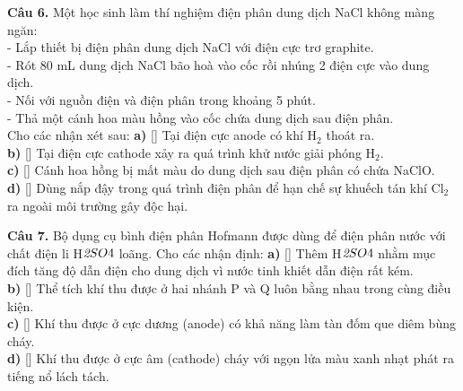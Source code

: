\documentclass{article}
\begin{document}
\fontsize{22}{29}\selectfont
\textbf{Câu 6.} Một học sinh làm thí nghiệm điện phân dung dịch NaCl không màng ngăn:\\ 
- Lắp thiết bị điện phân dung dịch NaCl với điện cực trơ graphite.\\ 
- Rót 80 mL dung dịch NaCl bão hoà vào cốc rồi nhúng 2 điện cực vào dung dịch.\\ 
- Nối với nguồn điện và điện phân trong khoảng 5 phút.\\ 
- Thả một cánh hoa màu hồng vào cốc chứa dung dịch sau điện phân.\\ 
Cho các nhận xét sau:
\vspace{6pt}
\textbf{a)} [\quad] Tại điện cực anode có khí H$_{\text{2}}$ thoát ra.\\[4pt]
\textbf{b)} [\quad] Tại điện cực cathode xảy ra quá trình khử nước giải phóng H$_{\text{2}}$.\\[4pt]
\textbf{c)} [\quad] Cánh hoa hồng bị mất màu do dung dịch sau điện phân có chứa NaClO.\\[4pt]
\textbf{d)} [\quad] Dùng nắp đậy trong quá trình điện phân để hạn chế sự khuếch tán khí Cl$_{\text{2}}$ ra ngoài môi trường gây độc hại.\\[4pt]
\vspace*{\fill}
\newpage

\fontsize{22}{29}\selectfont
\textbf{Câu 7.} Bộ dụng cụ bình điện phân Hofmann được dùng để điện phân nước với chất điện li H$\textit{{\text{2}}$SO$}{\text{4}}$ loãng. Cho các nhận định:
\vspace{6pt}
\textbf{a)} [\quad] Thêm H$\textit{{\text{2}}$SO$}{\text{4}}$ nhằm mục đích tăng độ dẫn điện cho dung dịch vì nước tinh khiết dẫn điện rất kém.\\[4pt]
\textbf{b)} [\quad] Thể tích khí thu được ở hai nhánh P và Q luôn bằng nhau trong cùng điều kiện.\\[4pt]
\textbf{c)} [\quad] Khí thu được ở cực dương (anode) có khả năng làm tàn đốm que diêm bùng cháy.\\[4pt]
\textbf{d)} [\quad] Khí thu được ở cực âm (cathode) cháy với ngọn lửa màu xanh nhạt phát ra tiếng nổ lách tách.\\[4pt]
\vspace*{\fill}
\newpage
\end{document}
